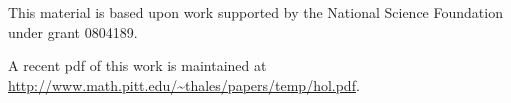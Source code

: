 \noindent

\bigskip\noindent
This material is based upon work supported by the National Science
Foundation under
grant 0804189.

\bigskip\noindent\svninfo 

\bigskip\noindent
A recent pdf of this work is maintained at\hfill\break 
\url{http://www.math.pitt.edu/~thales/papers/temp/hol.pdf}.


\smallskip
\newpage

